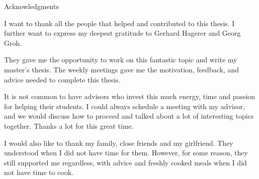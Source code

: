 \thispagestyle{empty}

\vspace*{20mm}

\begin{center}
{ Acknowledgments}
\end{center}

\vspace{10mm}

I want to thank all the people that helped and contributed to this thesis. I further want to express my deepest gratitude to Gerhard Hagerer and Georg Groh. 
\medskip

They gave me the opportunity to work on this fantastic topic and write my master's thesis. The weekly meetings gave me the motivation, feedback, and advice needed to complete this thesis. 
\medskip

It is not common to have advisors who invest this much energy, time and passion for helping their students. I could always schedule a meeting with my advisor, and we would discuss how to proceed and talked about a lot of interesting topics together. Thanks a lot for this great time.
\medskip

I would also like to thank my family, close friends and my girlfriend. They understood when I did not have time for them. However, for some reason, they still supported me regardless, with advice and freshly cooked meals when I did not have time to cook.
\cleardoublepage{}
